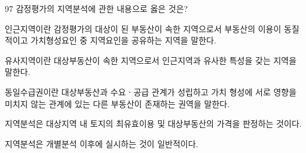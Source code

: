 \begin{question}{97}
감정평가의 지역분석에 관한 내용으로 옳은 것은?
\begin{choices}
  \item 인근지역이란 감정평가의 대상이 된 부동산이 속한 지역으로서 부동산의 이용이 동질적이고 가치형성요인 중 지역요인을 공유하는 지역을 말한다.
  \item 유사지역이란 대상부동산이 속한 지역으로서 인근지역과 유사한 특성을 갖는 지역을 말한다.
  \item 동일수급권이란 대상부동산과 수요ㆍ공급 관계가 성립하고 가치 형성에 서로 영향을 미치지 않는 관계에 있는 다른 부동산이 존재하는 권역을 말한다.
  \item 지역분석은 대상지역 내 토지의 최유효이용 및 대상부동산의 가격을 판정하는 것이다.
  \item 지역분석은 개별분석 이후에 실시하는 것이 일반적이다.
\end{choices}
\end{question}
